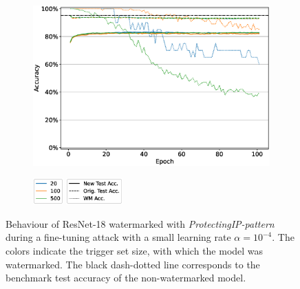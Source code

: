 \begin{figure}
    \centering
    \begin{subfigure}[b]{\linewidth}
    \centering
    \includegraphics[width=0.7 \linewidth]{images/finetuning/finetuning_protecting_content_trgsetsizes_thesis_resnet18.eps}
    \end{subfigure}
    \begin{subfigure}[b]{\linewidth}
    \centering
    \includegraphics[height=1cm]{images/finetuning/legend_finetuning_protecting_content_trgsetsizes_colors.eps}
    \quad
    \includegraphics[height=1cm]{images/finetuning/legend_finetuning_protecting_content_trgsetsizes_linetypes.eps}
    \end{subfigure}
    \caption{Behaviour of ResNet-18 watermarked with \textit{ProtectingIP-pattern} during a fine-tuning attack with a small learning rate $\alpha=10^{-4}$. The colors indicate the trigger set size, with which the model was watermarked. The black dash-dotted line corresponds to the benchmark test accuracy of the non-watermarked model.}
    \label{fig:finetuning-content-trgsetsizes}
\end{figure}